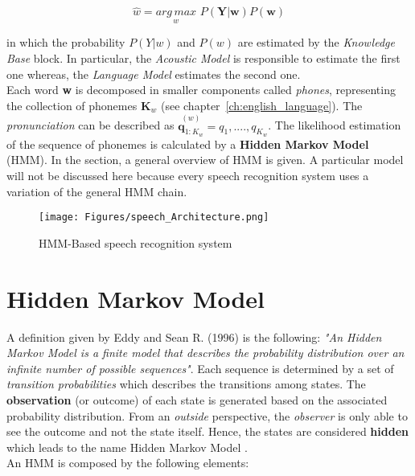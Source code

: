 \begin{equation}
	\widehat{w} = \underset{w}{arg \, max} \,\, P (\textbf{Y}|\textbf{w}) P(\textbf{w})
\end{equation}

\noindent in which the probability $P(Y|w)$ and $P(w)$ are estimated by the \textit{Knowledge Base} block. In particular, the \textit{Acoustic Model} is responsible to estimate the first one whereas, the \textit{Language Model} estimates the second one. \\
\noindent Each word \textbf{w} is decomposed in smaller components called \textit{phones}, representing the collection of phonemes $\textbf{K}_{w}$ (see chapter~\ref{ch:english_language}). The \textit{pronunciation} can be described as $\overset{(w)}{\textbf{q}_{1:K_{w}}} = q_{1}, ...., q_{K_{w}}$. The likelihood estimation of the sequence of phonemes is calculated by a \textbf{Hidden Markov Model} (HMM). In the section, a general overview of HMM is given. A particular model will not be discussed here because every speech recognition system uses a variation of the general HMM chain. \\

\begin{figure}[!ht]
	\centering
	\texttt{[image: Figures/speech\_Architecture.png]}
	\caption{HMM-Based speech recognition system \cite{gales2008application}}
	\label{fig:speech_architecture}
\end{figure}

\section{Hidden Markov Model}
\label{sec:hmm}
\noindent A definition given by Eddy and Sean R. (1996) is the following: \textit{"An Hidden Markov Model is a finite model that describes the probability distribution over an infinite number of possible sequences"}. Each sequence is determined by a set of \textit{transition probabilities} which describes the transitions among states. The \textbf{observation} (or outcome) of each state is generated based on the associated probability distribution. From an \textit{outside} perspective, the \textit{observer} is only able to see the outcome and not the state itself. Hence, the states are considered \textbf{hidden} which leads to the name Hidden Markov Model \cite{def_hmm}. \\

\noindent An HMM is composed by the following elements:

